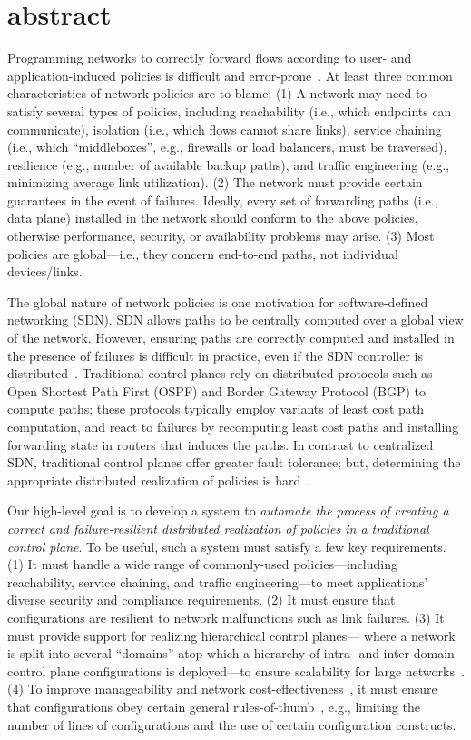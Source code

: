 \documentclass[sigconf]{acmart}
\begin{document}
\section*{abstract}
Programming networks to correctly forward flows according to user- and
application-induced policies is difficult and
error-prone~\cite{troubleshooting, bgpmisconfig}. 
At least three
common characteristics of network policies are to blame: (1) A network
may need to satisfy several types of policies, including reachability
(i.e., which endpoints can communicate), isolation (i.e., which flows
cannot share links), service chaining (i.e., which ``middleboxes'',
e.g., firewalls or load balancers, must be traversed), resilience
(e.g., number of available backup paths), and traffic engineering
(e.g., minimizing average link utilization). (2) The network must
provide certain guarantees in the event of failures. Ideally, every
set of forwarding paths (i.e., data plane) installed in the network
should conform to the above policies, otherwise performance, security, or
availability problems may arise. (3) Most policies are global---i.e.,
they concern end-to-end paths, not individual devices/links.

The global nature of network policies is one motivation for
software-defined networking (SDN). SDN allows paths to be centrally
computed over a global view of the network. However, ensuring paths
are correctly computed and installed in the presence of failures is
difficult in practice, even if the SDN controller is
distributed~\cite{hasdn}.  Traditional control planes rely on
distributed protocols such as Open Shortest Path First (OSPF) and
Border Gateway Protocol (BGP) to compute paths; these protocols
typically employ variants of least cost path computation, and react to
failures by recomputing least cost paths and installing forwarding
state in routers that induces the paths. In contrast to centralized
SDN, traditional control planes offer greater fault tolerance; but,
determining the appropriate distributed realization of policies is
hard~\cite{propane}.

Our high-level goal is to develop a system to {\em automate the
  process of creating a correct and failure-resilient distributed
  realization of policies in a traditional control plane}. To be
useful, such a system must satisfy a few key requirements. (1) It must
handle a wide range of commonly-used policies---including
reachability, service chaining, and traffic engineering---to meet
applications' diverse security and compliance requirements. (2) It
must ensure that configurations are resilient to network malfunctions
such as link failures. (3) It must provide support for realizing
hierarchical control planes--- where a network is split into several
``domains'' atop which a hierarchy of intra- and inter-domain control
plane configurations is deployed---to ensure scalability for large
networks~\cite{routingdesign}. (4) To improve manageability and
network cost-effectiveness~\cite{mpa-imc15,complexity:sigcomm11}, it
must ensure that configurations obey certain general
rules-of-thumb~\cite{complexity:nsdi09}, e.g., limiting the number of
lines of configurations and the use of certain configuration
constructs.
\end{document}
